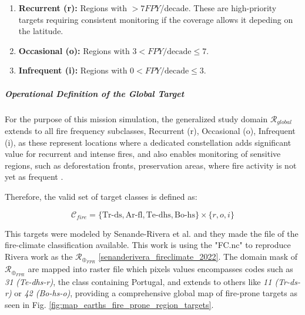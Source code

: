 \begin{table}[ht]
{\begin{enumerate}

    \item \textbf{Recurrent (r):} Regions with $> 7 FPY$/decade. These are high-priority targets requiring consistent monitoring if the coverage allows it depeding on the latitude.

    \item \textbf{Occasional (o):} Regions with $3 < FPY\text{/decade} \leq 7$.

    \item \textbf{Infrequent (i):} Regions with $0 < FPY\text{/decade} \leq 3$.

\end{enumerate}



\subparagraph{Operational Definition of the Global Target} \hspace{0pt}



For the purpose of this mission simulation, the generalized study domain $\mathcal{R}_{global}$ extends to all fire frequency subclasses, Recurrent (r), Occasional (o), Infrequent (i), as these represent locations where a dedicated constellation adds significant value for recurrent and intense fires, and also enables monitoring of sensitive regions, such as deforestation fronts, preservation areas, where fire activity is not yet as frequent .

Therefore, the valid set of target classes is defined as:

\begin{equation}

    \mathcal{C}_{fire} = \{ \text{Tr-ds}, \text{Ar-fl}, \text{Te-dhs}, \text{Bo-hs} \} \times \{ r, o, i \}

\end{equation}

This targets were modeled by Senande-Rivera et al. and they made the file of the fire-climate classification available. This work is using the "FC.nc" to reproduce Rivera work as the $\mathcal{R}_{\oplus_{FPR}}$  \ref{senanderivera_fireclimate_2022}. The domain mask of $\mathcal{R}_{\oplus_{FPR}}$ are mapped into raster file which pixels values encompasses codes such as \textit{31 (Te-dhs-r)}, the class containing Portugal, and extends to others like \textit{11 (Tr-ds-r)} or \textit{42 (Bo-hs-o)}, providing a comprehensive global map of fire-prone targets as seen in Fig. \ref{fig:map_earths_fire_prone_region_targets}.



}
\end{table}
